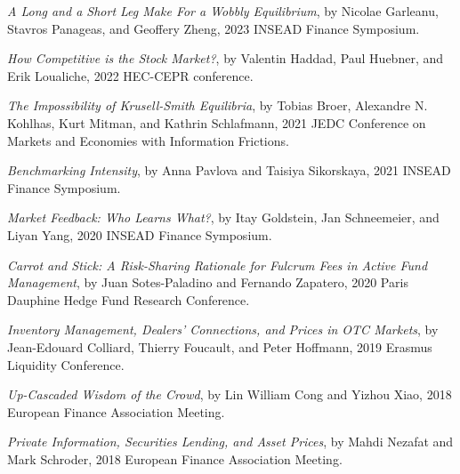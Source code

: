 \documentclass[11pt]{article}
\begin{document}
\textit{A Long and a Short Leg Make For a Wobbly Equilibrium}, by Nicolae Garleanu, Stavros Panageas, and Geoffery Zheng, 2023 INSEAD Finance Symposium. \\
\vspace{-.1in}

\textit{How Competitive is the Stock Market?}, by Valentin Haddad, Paul Huebner, and Erik Loualiche, 2022 HEC-CEPR conference. \\
\vspace{-.1in}

\textit{The Impossibility of Krusell-Smith Equilibria}, by Tobias Broer, Alexandre N. Kohlhas, Kurt Mitman, and Kathrin Schlafmann, 2021 JEDC Conference on Markets and Economies with Information Frictions. \\
\vspace{-.1in}

\textit{Benchmarking Intensity}, by Anna Pavlova and Taisiya Sikorskaya, 2021 INSEAD Finance Symposium. \\
\vspace{-.1in}

\textit{Market Feedback: Who Learns What?}, by Itay Goldstein, Jan Schneemeier, and Liyan Yang, 2020 INSEAD Finance Symposium. \\
\vspace{-.1in}

\textit{Carrot and Stick: A Risk-Sharing Rationale for Fulcrum Fees in Active Fund Management}, by Juan Sotes-Paladino and Fernando Zapatero, 2020 Paris Dauphine Hedge Fund Research Conference. \\
\vspace{-.1in}

\textit{Inventory Management, Dealers' Connections, and Prices in OTC Markets}, by Jean-Edouard Colliard, Thierry Foucault, and Peter Hoffmann, 2019 Erasmus Liquidity Conference. \\
\vspace{-.1in}

\textit{Up-Cascaded Wisdom of the Crowd}, by Lin William Cong and Yizhou Xiao, 2018 European Finance Association Meeting. \\
\vspace{-.1in}

\textit{Private Information, Securities Lending, and Asset Prices}, by Mahdi Nezafat and Mark Schroder, 2018 European Finance Association Meeting. \\
\vspace{-.1in}
\end{document}
